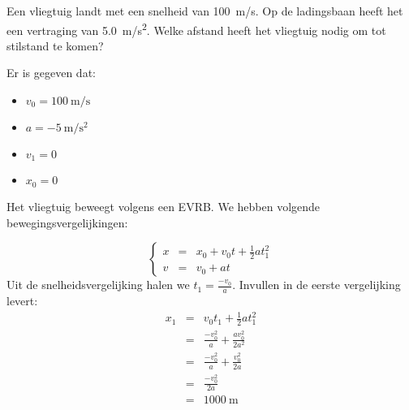\documentclass{ximera}
\begin{document}
\begin{exercise}
    Een vliegtuig landt met een snelheid van \SI{100}{m/s}. Op de ladingsbaan heeft het een vertraging van \SI{5,0}{m/s^2}. Welke afstand heeft het vliegtuig nodig om tot stilstand te komen?
    \begin{oplossing}
        Er is gegeven dat: 
        \begin{itemize}
            \item \(v_0 = \SI{100}{\meter\per\second}\)
            \item \(a = \SI{-5}{\meter\per\second\squared}\)
            \item \(v_1 = 0\)
            \item \(x_0 = 0\)
        \end{itemize}
        Het vliegtuig beweegt volgens een EVRB. We hebben volgende bewegingsvergelijkingen: 
        
        \[\left\{
            \begin{array}{rcl}
            x&=& x_0 + v_0t+\frac{1}{2}at_1^2 \\
            v&=& v_0 + at
            \end{array}
        \right.
        \]
        Uit de snelheidsvergelijking halen we \(t_1 = \frac{-v_0}{a}\). Invullen in de eerste vergelijking levert: 
        \[
        \begin{array}{rcl}
            x_1 &=& v_0t_1 + \frac{1}{2}at_1^2\\
            &=& \frac{-v_0^2}{a} + \frac{av_0^2}{2a^2}\\
            &=& \frac{-v_0^2}{a} + \frac{v_0^2}{2a}\\
            &=& \frac{-v_0^2}{2a}\\
            &=& \SI{1000}{\meter}
        \end{array}
        \]
    \end{oplossing}
\end{exercise}
\end{document}
